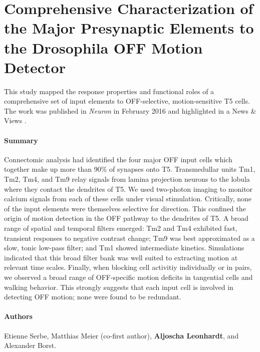 \section{Comprehensive Characterization of the Major Presynaptic Elements to the Drosophila OFF Motion Detector}
\label{sct:manuscript_serbe}

This study mapped the response properties and functional roles of a comprehensive set of input elements to OFF-selective, motion-sensitive T5 cells. The work was published in \textit{Neuron} in February 2016 \citep{Serbe:2016ew} and highlighted in a News \& Views \citep{Tuthill:2016aa}.

\paragraph{Summary}
Connectomic analysis had identified the four major OFF input cells which together make up more than 90\% of synapses onto T5. Transmedullar units Tm1, Tm2, Tm4, and Tm9 relay signals from lamina projection neurons to the lobula where they contact the dendrites of T5. We used two-photon imaging to monitor calcium signals from each of these cells under visual stimulation. Critically, none of the input elements were themselves selective for direction. This confined the origin of motion detection in the OFF pathway to the dendrites of T5. A broad range of spatial and temporal filters emerged: Tm2 and Tm4 exhibited fast, transient responses to negative contrast change; Tm9 was best approximated as a slow, tonic low-pass filter; and Tm1 showed intermediate kinetics. Simulations indicated that this broad filter bank was well suited to extracting motion at relevant time scales. Finally, when blocking cell activitiy individually or in pairs, we observed a broad range of OFF-specific motion deficits in tangential cells and walking behavior. This strongly suggests that each input cell is involved in detecting OFF motion; none were found to be redundant.

\paragraph{Authors} Etienne Serbe, Matthias Meier (co-first author), \textbf{Aljoscha Leonhardt}, and Alexander Borst.

